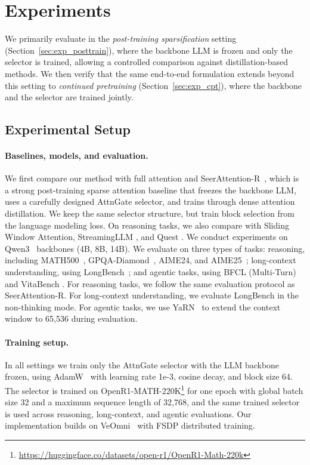 \section{Experiments}
\label{sec:experiments}

We primarily evaluate \our in the \emph{post-training sparsification} setting (Section~\ref{sec:exp_posttrain}), where the backbone LLM is frozen and only the selector is trained, allowing a controlled comparison against distillation-based methods. We then verify that the same end-to-end formulation extends beyond this setting to \emph{continued pretraining} (Section~\ref{sec:exp_cpt}), where the backbone and the selector are trained jointly.

\subsection{Experimental Setup}

\paragraph{Baselines, models, and evaluation.}
We first compare our method with full attention and  SeerAttention-R~\cite{gao2025seerattention}, 
which is a strong post-training sparse attention baseline that freezes the backbone LLM, uses a carefully designed AttnGate selector, and trains through dense attention distillation. 
We keep the same selector structure, but train block selection from the language modeling loss.
On reasoning tasks, we also compare with Sliding Window Attention, StreamingLLM \cite{xiao2024efficient}, and Quest \cite{tang2024quest}.
We conduct experiments on Qwen3~\cite{yang2025qwen3technicalreport} backbones (4B, 8B, 14B).
We evaluate on three types of tasks: reasoning, including MATH500~\cite{math500}, GPQA-Diamond~\cite{gpqa}, AIME24, and AIME25~\cite{aime}; long-context understanding, using LongBench~\cite{longbench}; and agentic tasks, using BFCL (Multi-Turn) \cite{patil2025bfcl} and VitaBench \cite{he2026vitabench}.
For reasoning tasks, we follow the same evaluation protocol as SeerAttention-R.
For long-context understanding, we evaluate LongBench in the non-thinking mode.
For agentic tasks, we use YaRN~\cite{peng2024yarn} to extend the context window to 65{,}536 during evaluation.

\paragraph{Training setup.}
In all settings we train only the AttnGate selector with the LLM backbone frozen, using AdamW~\cite{loshchilov2017decoupled} with learning rate 1e-3, cosine decay, and block size 64.
The selector is trained on OpenR1-MATH-220K\footnote{\url{https://huggingface.co/datasets/open-r1/OpenR1-Math-220k}} for one epoch with global batch size 32 and a maximum sequence length of 32{,}768, and the same trained selector is used across reasoning, long-context, and agentic evaluations.
Our implementation builds on VeOmni~\cite{ma2025veomni} with FSDP distributed training.

